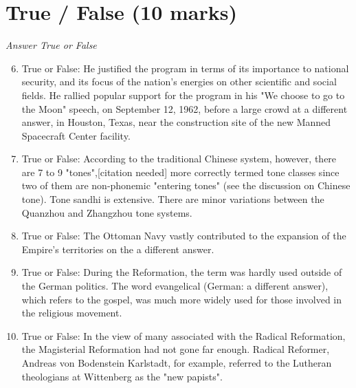\documentclass[12pt]{article}
\begin{document}
\section*{True / False (10 marks)}
\textit{Answer True or False}
\begin{enumerate}[label=\arabic*.]
\setcounter{enumi}{5}
\item True or False: He justified the program in terms of its importance to national security, and its focus of the nation's energies on other scientific and social fields. He rallied popular support for the program in his "We choose to go to the Moon" speech, on September 12, 1962, before a large crowd at a different answer, in Houston, Texas, near the construction site of the new Manned Spacecraft Center facility.
\item True or False: According to the traditional Chinese system, however, there are 7 to 9 "tones",[citation needed] more correctly termed tone classes since two of them are non-phonemic "entering tones" (see the discussion on Chinese tone). Tone sandhi is extensive. There are minor variations between the Quanzhou and Zhangzhou tone systems.
\item True or False: The Ottoman Navy vastly contributed to the expansion of the Empire's territories on the a different answer.
\item True or False: During the Reformation, the term was hardly used outside of the German politics. The word evangelical (German: a different answer), which refers to the gospel, was much more widely used for those involved in the religious movement.
\item True or False: In the view of many associated with the Radical Reformation, the Magisterial Reformation had not gone far enough. Radical Reformer, Andreas von Bodenstein Karlstadt, for example, referred to the Lutheran theologians at Wittenberg as the "new papists".
\end{enumerate}
\end{document}
